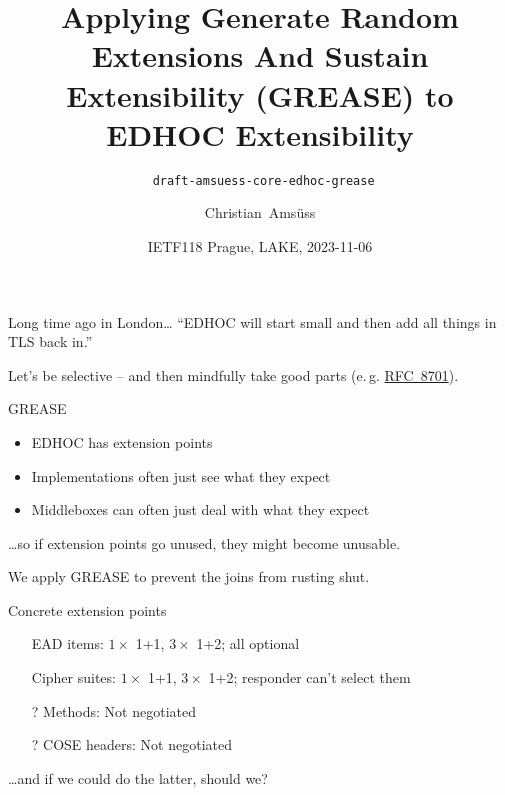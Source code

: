 \documentclass[aspectratio=169,colorlinks]{beamer}
\title[Applying GREASE to EDHOC]{Applying Generate Random Extensions And Sustain Extensibility (GREASE) to EDHOC Extensibility}
\subtitle{\texttt{ draft-amsuess-core-edhoc-grease}}
\author{Christian~Amsüss}
\date{IETF118 Prague, LAKE, 2023-11-06}
\newcommand{\rfc}[1]{\href{https://datatracker.ietf.org/doc/html/rfc#1}{RFC~#1}}
\begin{document}
\frame{\titlepage}

\begin{frame}{Long time ago in London\ldots}\Large
  ``EDHOC will start small and then add all things in TLS back in.''

  \bigskip

  Let's be selective -- and then mindfully take good parts (e.\,g. \rfc{8701}).
\end{frame}

\begin{frame}{GREASE}\Large
  \begin{itemize}
    \item EDHOC has extension points
    \item Implementations often just see what they expect
    \item Middleboxes can often just deal with what they expect
  \end{itemize}

  \bigskip

  \ldots so if extension points go unused, they might become unusable.

  \bigskip

  We apply GREASE to prevent the joins from rusting shut.
\end{frame}

\begin{frame}{Concrete extension points}\Large
  \begin{itemize}
    \item[\ding{52}] EAD items: $1\times$ 1+1, $3\times$ 1+2; all optional
    \item[\ding{52}] Cipher suites: $1\times$ 1+1, $3\times$ 1+2; responder can't select them
    \item[?] Methods: Not negotiated
    \item[?] COSE headers: Not negotiated %
  \end{itemize}

  \bigskip

  \ldots and if we could do the latter, should we?
\end{frame}
\end{document}
